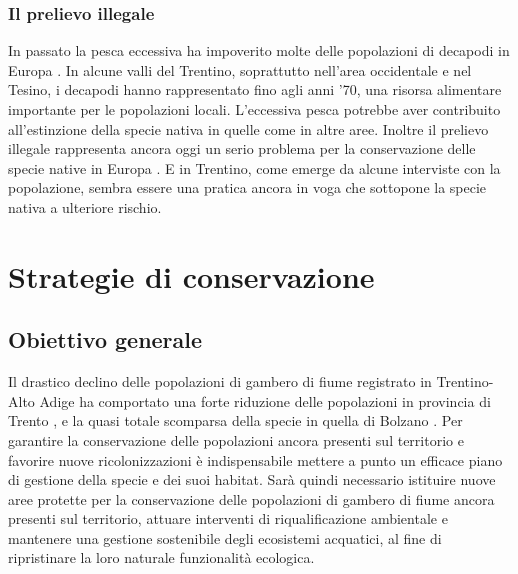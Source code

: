 \documentclass[10pt,twoside,openany,x11names,svgnames,italian,a5paper,dvipsnames,table]{memoir}
\newcommand\chapterillustration{}
\begin{document}
\subsection{Il prelievo illegale}

In passato la pesca eccessiva ha impoverito molte delle popolazioni di decapodi in Europa \cite{Endrizzi13a}. In alcune valli del Trentino, soprattutto nell’area occidentale e nel Tesino, i decapodi hanno rappresentato fino agli anni ’70, una risorsa alimentare importante per le popolazioni locali. L’eccessiva pesca potrebbe aver contribuito all’estinzione della specie nativa in quelle come in altre aree. Inoltre il prelievo illegale rappresenta ancora oggi un serio problema per la conservazione delle specie native in Europa \cite{Souty}. E in Trentino, come emerge da alcune interviste con la popolazione, sembra essere una pratica ancora in voga che sottopone la specie nativa a ulteriore rischio.


\chapter{Strategie di conservazione}
\renewcommand\chapterillustration{7.jpg}

\section{Obiettivo generale}
Il drastico declino delle popolazioni di gambero di fiume registrato in Trentino-Alto Adige ha comportato una forte riduzione delle popolazioni in provincia di Trento \cite{Endrizzi13a}, e la quasi totale scomparsa della specie in quella di Bolzano \cite{Fureder} \cite{Sint}. Per garantire la conservazione delle popolazioni ancora presenti sul territorio e favorire nuove ricolonizzazioni è indispensabile mettere a punto un efficace piano di gestione della specie e dei suoi habitat. Sarà quindi necessario istituire nuove aree protette per la conservazione delle popolazioni di gambero di fiume ancora presenti sul territorio, attuare interventi di riqualificazione ambientale e mantenere una gestione sostenibile degli ecosistemi acquatici, al fine di ripristinare la loro naturale funzionalità ecologica.
\end{document}
